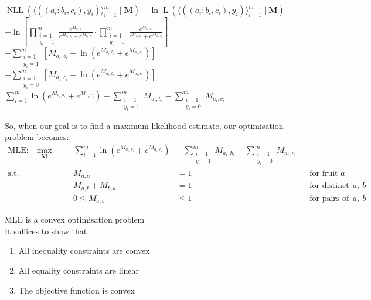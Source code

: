 \begin{itemize}
  \step $\operatorname{NLL}(\langle((a_i:b_i,c_i),y_i)\rangle_{i=1}^m\mid\mathbf{M})$
  \step[=] $-\ln\operatorname{L}(\langle((a_i:b_i,c_i),y_i)\rangle_{i=1}^m\mid\mathbf{M})$
  \step[=] $\displaystyle-\ln\left[\prod_{\substack{i=1\\y_i=1}}^m\frac{e^{M_{a_i,b_i}}}{e^{M_{a_i,b_i}} + e^{M_{a_i,c_i}}}\cdot\prod_{\substack{i=1\\y_i=0}}^m\frac{e^{M_{a_i,c_i}}}{e^{M_{a_i,b_i}}+e^{M_{a_i,c_i}}}\right]$
  \step[=] $\displaystyle-\sum_{\substack{i=1\\y_i=1}}^m\left[M_{a_i,b_i} - \ln(e^{M_{a_i,b_i}}+e^{M_{a_i,c_i}})\right]$
  \step $\displaystyle-\sum_{\substack{i=1\\y_i=0}}^m\left[M_{a_i,c_i} - \ln(e^{M_{a_i,b_i}}+e^{M_{a_i,c_i}})\right]$
  \step[=] $\displaystyle\sum_{i=1}^m\ln(e^{M_{a_i,b_i}} + e^{M_{a_i,c_i}}) - \sum_{\substack{i=1\\y_i=1}}^mM_{a_i,b_i} - \sum_{\substack{i=1\\y_i=0}}^mM_{a_i,c_i}$
\end{itemize}

So, when our goal is to find a maximum likelihood estimate, our optimisation problem becomes:
\begin{align*}
  \text{MLE:}\quad\max_{\mathbf{M}}\quad&&
  \sum_{i=1}^m\ln(e^{M_{a_i,b_i}} + e^{M_{a_i,c_i}}) & - \sum_{\substack{i=1\\y_i=1}}^mM_{a_i,b_i} - \sum_{\substack{i=1\\y_i=0}}^mM_{a_i,c_i}\\
  \text{s.t. }\quad&& M_{a,a} & = 1 && \text{for fruit }a
  \\ && M_{a,b} + M_{b,a} & = 1      && \text{for distinct fruits }a,~b
  \\ && 0 \leq M_{a,b} & \leq 1     && \text{for pairs of fruits }a,~b
\end{align*}

\begin{prop}
  MLE is a convex optimisation problem\\[1em]
  \noindent It suffices to show that
  \begin{enumerate}[1.]
    \item All inequality constraints are convex
    \item All equality constraints are linear
    \item The objective function is convex
  \end{enumerate}
\end{prop}

